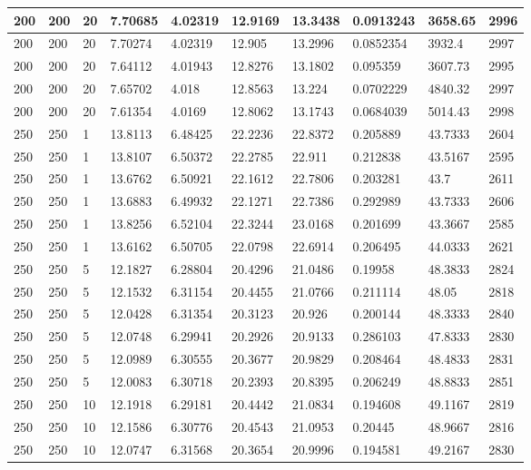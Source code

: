 \begin{landscape}
\begin{longtable}{ | l | l | l | l | l | l | l | l | l | l | }
200 & 200 & 20 & 7.70685 & 4.02319 & 12.9169 & 13.3438 & 0.0913243 & 3658.65 & 2996\\ \hline
200 & 200 & 20 & 7.70274 & 4.02319 & 12.905 & 13.2996 & 0.0852354 & 3932.4 & 2997\\ \hline
200 & 200 & 20 & 7.64112 & 4.01943 & 12.8276 & 13.1802 & 0.095359 & 3607.73 & 2995\\ \hline
200 & 200 & 20 & 7.65702 & 4.018 & 12.8563 & 13.224 & 0.0702229 & 4840.32 & 2997\\ \hline
200 & 200 & 20 & 7.61354 & 4.0169 & 12.8062 & 13.1743 & 0.0684039 & 5014.43 & 2998\\ \hline
250 & 250 & 1 & 13.8113 & 6.48425 & 22.2236 & 22.8372 & 0.205889 & 43.7333 & 2604\\ \hline
250 & 250 & 1 & 13.8107 & 6.50372 & 22.2785 & 22.911 & 0.212838 & 43.5167 & 2595\\ \hline
250 & 250 & 1 & 13.6762 & 6.50921 & 22.1612 & 22.7806 & 0.203281 & 43.7 & 2611\\ \hline
250 & 250 & 1 & 13.6883 & 6.49932 & 22.1271 & 22.7386 & 0.292989 & 43.7333 & 2606\\ \hline
250 & 250 & 1 & 13.8256 & 6.52104 & 22.3244 & 23.0168 & 0.201699 & 43.3667 & 2585\\ \hline
250 & 250 & 1 & 13.6162 & 6.50705 & 22.0798 & 22.6914 & 0.206495 & 44.0333 & 2621\\ \hline
250 & 250 & 5 & 12.1827 & 6.28804 & 20.4296 & 21.0486 & 0.19958 & 48.3833 & 2824\\ \hline
250 & 250 & 5 & 12.1532 & 6.31154 & 20.4455 & 21.0766 & 0.211114 & 48.05 & 2818\\ \hline
250 & 250 & 5 & 12.0428 & 6.31354 & 20.3123 & 20.926 & 0.200144 & 48.3333 & 2840\\ \hline
250 & 250 & 5 & 12.0748 & 6.29941 & 20.2926 & 20.9133 & 0.286103 & 47.8333 & 2830\\ \hline
250 & 250 & 5 & 12.0989 & 6.30555 & 20.3677 & 20.9829 & 0.208464 & 48.4833 & 2831\\ \hline
250 & 250 & 5 & 12.0083 & 6.30718 & 20.2393 & 20.8395 & 0.206249 & 48.8833 & 2851\\ \hline
250 & 250 & 10 & 12.1918 & 6.29181 & 20.4442 & 21.0834 & 0.194608 & 49.1167 & 2819\\ \hline
250 & 250 & 10 & 12.1586 & 6.30776 & 20.4543 & 21.0953 & 0.20445 & 48.9667 & 2816\\ \hline
250 & 250 & 10 & 12.0747 & 6.31568 & 20.3654 & 20.9996 & 0.194581 & 49.2167 & 2830\\ \hline

\end{longtable}
\end{landscape}
